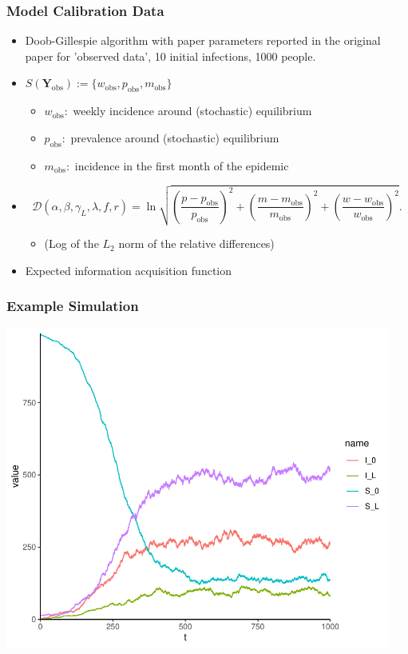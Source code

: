 \documentclass{beamer}
\begin{document}
\begin{frame}
    \frametitle{Model Calibration Data}\begin{itemize}
        \item Doob-Gillespie algorithm with paper parameters reported in the original paper for 'observed data', 10 initial infections, 1000 people.
        \item <2->$S(\mathbf{Y}_\text{obs}) := \{w_\text{obs}, p_\text{obs}, m_\text{obs}\}$ \begin{itemize}
                  \item $w_\text{obs}:$ weekly incidence around (stochastic) equilibrium
                  \item $p_\text{obs}:$ prevalence around (stochastic) equilibrium
                  \item $m_\text{obs}:$ incidence in the first month of the epidemic
              \end{itemize}
        \item <3-> $$
                  \mathcal{D}(\alpha, \beta, \gamma_L, \lambda, f, r) = \ln\sqrt{
                      \left(\frac{p - p_\text{obs}}{p_\text{obs}}\right)^2
                      + \left(\frac{m - m_\text{obs}}{m_\text{obs}}\right)^2
                      + \left(\frac{w - w_\text{obs}}{w_\text{obs}}\right)^2
                  }.
              $$ \begin{itemize}
                  \item (Log of the $L_2$ norm of the relative differences)
              \end{itemize}
        \item Expected information acquisition function
    \end{itemize}
\end{frame}

\begin{frame}
    \frametitle{Example Simulation}
    \includegraphics[width=0.95\textwidth]{doob_champagne.pdf}
\end{frame}
\end{document}
